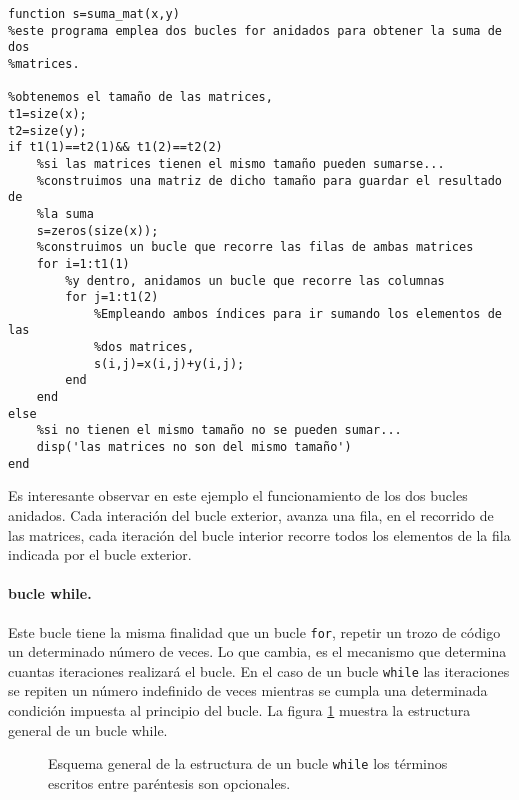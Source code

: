 \begin{verbatim}
function s=suma_mat(x,y)
%este programa emplea dos bucles for anidados para obtener la suma de dos
%matrices.

%obtenemos el tamaño de las matrices,
t1=size(x);
t2=size(y);
if t1(1)==t2(1)&& t1(2)==t2(2)
    %si las matrices tienen el mismo tamaño pueden sumarse...
    %construimos una matriz de dicho tamaño para guardar el resultado de
    %la suma
    s=zeros(size(x));
    %construimos un bucle que recorre las filas de ambas matrices
    for i=1:t1(1)
        %y dentro, anidamos un bucle que recorre las columnas
        for j=1:t1(2)
            %Empleando ambos índices para ir sumando los elementos de las
            %dos matrices,
            s(i,j)=x(i,j)+y(i,j);
        end
    end
else
    %si no tienen el mismo tamaño no se pueden sumar...
    disp('las matrices no son del mismo tamaño')
end
\end{verbatim} 

Es interesante observar en este ejemplo el funcionamiento de los dos bucles anidados. Cada interación del bucle exterior, avanza una fila, en el recorrido de las matrices, cada iteración del bucle interior recorre todos los elementos de la fila indicada por el bucle exterior.

\paragraph{bucle while.}  Este bucle tiene la misma finalidad que un bucle \texttt{for}, repetir un trozo de código un determinado número de veces. Lo que cambia, es el mecanismo que determina cuantas iteraciones realizará el bucle. En el caso de un bucle \texttt{while} las iteraciones se repiten un número indefinido de veces mientras se cumpla una determinada condición impuesta al principio del bucle. La figura \ref{fig:while} muestra la estructura general de un bucle while.

\begin{figure}[h]
\centering
{}
\caption{Esquema general de la estructura de un bucle \texttt{while} los términos escritos entre paréntesis son opcionales.}
\label{fig:while}
\end{figure}

